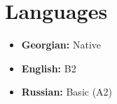 \documentclass{muratcan_cv}
\begin{document}
    

\vspace{1.5ex}
\section* {Languages}
\begin{itemize}
    \item \textbf{Georgian:} Native 
    \item \textbf{English:} B2
    \item \textbf{Russian:} Basic (A2)
\end{itemize}
\end{document}
